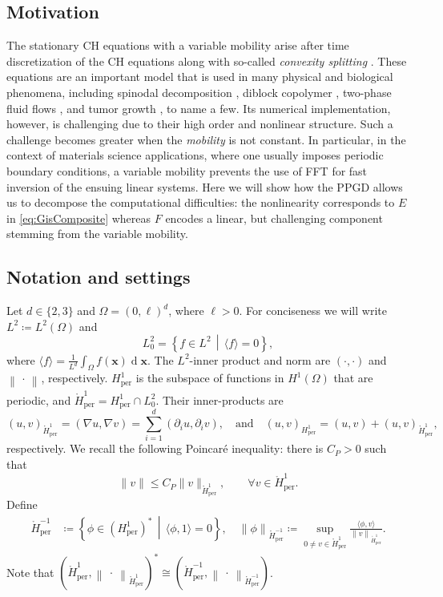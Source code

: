 \documentclass{amsart}
\newcommand{\mean}[1]{{\langle #1 \rangle}}
\newcommand{\bfx}{\boldsymbol{x}}
\newcommand{\Hm}{{\mathring H_{\mathrm{per}}^{-1}}}
\newcommand{\Homz}{{\mathring{H}_{\mathrm{per}}^{1}}}
\newcommand{\Ho}{{{H}_{\mathrm{per}}^{1}}}
\newcommand{\slot}{{\ \cdot \ }}
\newcommand{\dx}{{\operatorname{d}\!\bfx}}
\newcommand{\x}{\bfx}
\newcommand{\norm}[2]{\left\| #1 \right\| _{#2}}
\theoremstyle{definition}
\begin{document}
\subsection{Motivation}
The stationary CH equations with a variable mobility arise after time discretization of the CH equations along with so-called \emph{convexity splitting} \cite{eyre1998unconditionally}. 
These equations are an important model that is used in many physical and biological phenomena, including spinodal decomposition \cite{cahn1961spinodal}, diblock copolymer \cite{choksi2009phase}, two-phase fluid flows \cite{badalassi2003computation}, and tumor growth \cite{wise2008three}, to name a few.
Its numerical implementation, however, is challenging due to their high order and nonlinear structure. Such a challenge becomes greater when the \emph{mobility} is not constant. In particular, in the context of materials science applications, where one usually imposes periodic boundary conditions, a variable mobility prevents the use of FFT for fast inversion of the ensuing linear systems. Here we will show how the PPGD allows us to decompose the computational difficulties: the nonlinearity corresponds to $E$ in \eqref{eq:GisComposite} whereas $F$ encodes a linear, but challenging component stemming from the variable mobility.

\subsection{Notation and settings}
Let $d \in \{2,3\}$ and $\Omega = (0,\ell)^d$, where $\ell>0$. For conciseness we will write $L^2 \coloneqq L^2(\Omega)$ and
\[
  L^2_0 = \left\{ f \in L^2 \, \middle| \, \mean{f} = 0 \right\},
\]
where $\mean{f}=\frac{1}{L^d} \int_\Omega f(\x)\dx$.
The $L^2$-inner product and norm are $(\cdot,\cdot)$ and $\norm{ \, \cdot \, }{}$, respectively. $\Ho$ is the subspace of functions in $H^1(\Omega)$ that are periodic, and $\Homz = \Ho \cap L^2_0$.
Their inner-products are
\[
(u,v)_\Homz = (\nabla u, \nabla v) = \sum_{i=1}^d (\partial_i u , \partial_i v), \quad \text{and} \quad (u,v)_\Ho = (u,v) + (u, v)_\Homz,
\]
respectively. We recall the following Poincar\'e inequality: there is $C_P>0$ such that
\begin{equation}
	\label{eq:PoincareMeanZero}
	\| v \| \leq C_P \| v \|_{\Homz}, \qquad \forall v \in \Homz.
\end{equation}
Define
\begin{align}
	\Hm &\coloneqq \left\{\phi \in (\Ho)^* \, \middle| \, \langle \phi , 1 \rangle = 0  \right\},
	\quad
  \norm{\phi}{\Hm} \coloneqq  \sup_{0\ne  v\in\Homz} \frac{\langle \phi ,  v\rangle}{\norm{ v}{\Homz}} .
	\label{def:Hm}
\end{align}
Note that $(\Homz, \norm{\slot}{\Homz})^* \cong (\Hm, \norm{\slot}{\Hm})$.
\end{document}
